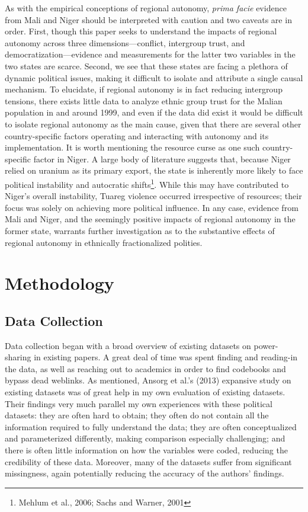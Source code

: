\documentclass[12pt]{article}
\begin{document}
As with the empirical conceptions of regional autonomy, \textit{prima facie} evidence from Mali and Niger should be interpreted with caution and two caveats are in order. First, though this paper seeks to understand the impacts of regional autonomy across three dimensions---conflict, intergroup trust, and democratization---evidence and measurements for the latter two variables in the two states are scarce. Second, we see that these states are facing a plethora of dynamic political issues, making it difficult to isolate and attribute a single causal mechanism. To elucidate, if regional autonomy is in fact reducing intergroup tensions, there exists little data to analyze ethnic group trust for the Malian population in and around 1999, and even if the data did exist it would be difficult to isolate regional autonomy as the main cause, given that there are several other country-specific factors operating and interacting with autonomy and its implementation. It is worth mentioning the resource curse as one such country-specific factor in Niger. A large body of literature suggests that, because Niger relied on uranium as its primary export, the state is inherently more likely to face political instability and autocratic shifts\footnote{Mehlum et al., 2006; Sachs and Warner, 2001}. While this may have contributed to Niger's overall instability, Tuareg violence occurred irrespective of resources; their focus was solely on achieving more political influence. In any case, evidence from Mali and Niger, and the seemingly positive impacts of regional autonomy in the former state, warrants further investigation as to the substantive effects of regional autonomy in ethnically fractionalized polities. 

\section{Methodology}
\subsection{Data Collection}
Data collection began with a broad overview of existing datasets on power-sharing in existing papers. A great deal of time was spent finding and reading-in the data, as well as reaching out to academics in order to find codebooks and bypass dead weblinks. As mentioned, Ansorg et al.’s (2013) expansive study on existing datasets was of great help in my own evaluation of existing datasets. Their findings very much parallel my own experiences with these political datasets: they are often hard to obtain; they often do not contain all the information required to fully understand the data; they are often conceptualized and parameterized differently, making comparison especially challenging; and there is often little information on how the variables were coded, reducing the credibility of these data. Moreover, many of the datasets suffer from significant missingness, again potentially reducing the accuracy of the authors’ findings. 
\end{document}
